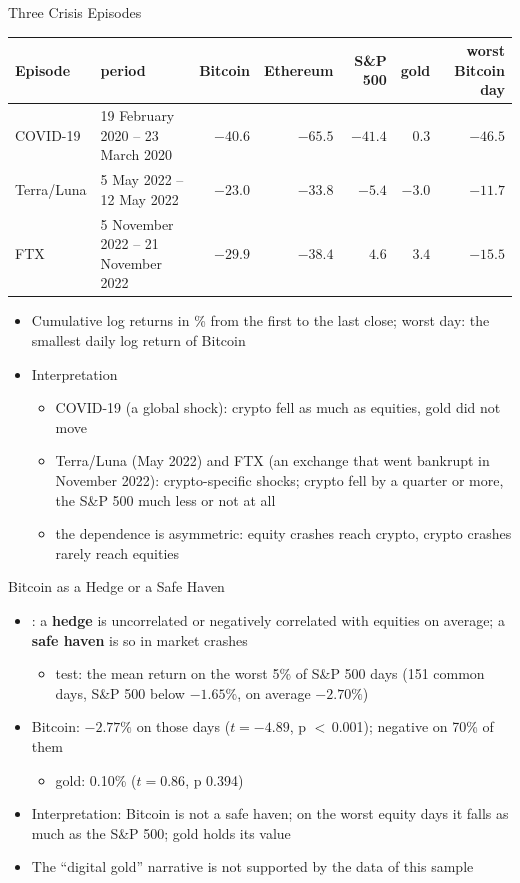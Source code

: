 \begin{frame}{Three Crisis Episodes}
\itemsize{\footnotesize}
\begin{center}
\scriptsize
\begin{tabular}{llrrrrr}
\toprule
Episode & period & Bitcoin & Ethereum & S\&P 500 & gold & worst Bitcoin day \\
\midrule
COVID-19 & 19 February 2020 -- 23 March 2020 & $-40.6$ & $-65.5$ & $-41.4$ & $0.3$ & $-46.5$ \\
Terra/Luna & 5 May 2022 -- 12 May 2022 & $-23.0$ & $-33.8$ & $-5.4$ & $-3.0$ & $-11.7$ \\
FTX & 5 November 2022 -- 21 November 2022 & $-29.9$ & $-38.4$ & $4.6$ & $3.4$ & $-15.5$ \\
\bottomrule
\end{tabular}
\end{center}
\begin{itemize}
    \item Cumulative log returns in \% from the first to the last close; worst day: the smallest daily log return of Bitcoin
    \item Interpretation
    \begin{itemize}
        \item COVID-19 (a global shock): crypto fell as much as equities, gold did not move
        \item Terra/Luna (May 2022) and FTX (an exchange that went bankrupt in November 2022): crypto-specific shocks; crypto fell by a quarter or more, the S\&P 500 much less or not at all
        \item the dependence is asymmetric: equity crashes reach crypto, crypto crashes rarely reach equities
    \end{itemize}
\end{itemize}
\end{frame}

\begin{frame}{Bitcoin as a Hedge or a Safe Haven}
\itemsize{\small}
\begin{itemize}
    \item {}: a \textbf{hedge} is uncorrelated or negatively correlated with equities on average; a \textbf{safe haven} is so in market crashes
    \begin{itemize}
        \item test: the mean return on the worst 5\% of S\&P 500 days (151 common days, S\&P 500 below $-1.65\%$, on average $-2.70\%$)
    \end{itemize}
    \item Bitcoin: $-2.77\%$ on those days ($t = -4.89$, p $<$\,0.001); negative on 70\% of them
    \begin{itemize}
        \item gold: 0.10\% ($t = 0.86$, p 0.394)
    \end{itemize}
    \item Interpretation: Bitcoin is not a safe haven; on the worst equity days it falls as much as the S\&P 500; gold holds its value
    \item The ``digital gold'' narrative is not supported by the data of this sample
\end{itemize}
\end{frame}


